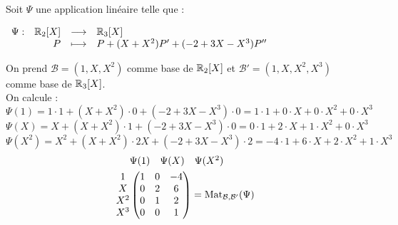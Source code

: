 \begin{example}
	Soit $\Psi$ une application linéaire telle que :
	\begin{center}
		$\begin{array}{rrcl} \Psi : & \mathbb{R}_2[X] & \longrightarrow & \mathbb{R}_3[X] \\ & P & \longmapsto & P + (X + X^2)P' + (-2 + 3X - X^3)P'' \end{array}$
	\end{center}
	On prend $\mathcal{B} = (1, X, X^2)$ comme base de $\mathbb{R}_2[X]$ et $\mathcal{B}' = (1, X, X^2, X^3)$ comme base de $\mathbb{R}_3[X]$.
	\\
	On calcule :
	\[ \Psi(1) = 1 \cdot 1 + (X + X^2) \cdot 0 + (-2 + 3X - X^3) \cdot 0 = 1 \cdot 1 + 0 \cdot X + 0 \cdot X^2 + 0 \cdot X^3 \]
	\[ \Psi(X) = X + (X + X^2) \cdot 1 + (-2 + 3X - X^3) \cdot 0 = 0 \cdot 1 + 2 \cdot X + 1 \cdot X^2 + 0 \cdot X^3 \]
	\[ \Psi(X^2) = X^2 + (X + X^2) \cdot 2X + (-2 + 3X - X^3) \cdot 2 = -4 \cdot 1 + 6 \cdot X + 2 \cdot X^2 + 1 \cdot X^3 \]
	\begin{align*}
		&\begin{matrix}
			\Psi(1) & \Psi(X) & \Psi(X^2)
		\end{matrix}
		\\
		\begin{matrix}
			1 \\
			X \\
			X^2 \\
			X^3
		\end{matrix}
		&
		\begin{pmatrix}
			1 & 0 & -4 \\
			0 & 2 & 6 \\
			0 & 1 & 2 \\
			0 & 0 & 1
		\end{pmatrix}
		= \operatorname{Mat}_{\mathcal{B}, \mathcal{B'}}(\Psi)
	\end{align*}
\end{example}


